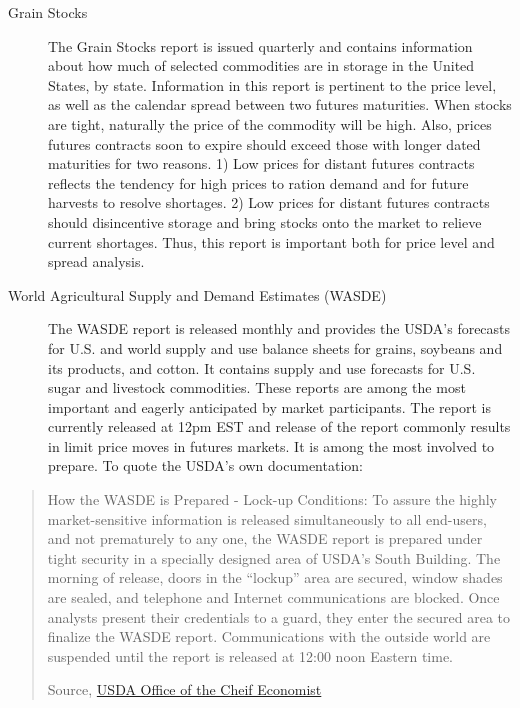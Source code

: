 \documentclass[
]{book}
\begin{document}
\begin{description}
\item[Grain Stocks]
The Grain Stocks report is issued quarterly and contains information about how much of selected commodities are in storage in the United States, by state. Information in this report is pertinent to the price level, as well as the calendar spread between two futures maturities. When stocks are tight, naturally the price of the commodity will be high. Also, prices futures contracts soon to expire should exceed those with longer dated maturities for two reasons. 1) Low prices for distant futures contracts reflects the tendency for high prices to ration demand and for future harvests to resolve shortages. 2) Low prices for distant futures contracts should disincentive storage and bring stocks onto the market to relieve current shortages. Thus, this report is important both for price level and spread analysis.
\item[World Agricultural Supply and Demand Estimates (WASDE)]
The WASDE report is released monthly and provides the USDA's forecasts for U.S. and world supply and use balance sheets for grains, soybeans and its products, and cotton. It contains supply and use forecasts for U.S. sugar and livestock commodities. These reports are among the most important and eagerly anticipated by market participants. The report is currently released at 12pm EST and release of the report commonly results in limit price moves in futures markets. It is among the most involved to prepare. To quote the USDA's own documentation:
\end{description}

\begin{quote}
How the WASDE is Prepared - Lock-up Conditions: To assure the highly market-sensitive information is released simultaneously to all end-users, and not prematurely to any one, the WASDE report is prepared under tight security in a specially designed area of USDA's South Building. The morning of release, doors in the ``lockup'' area are secured, window shades are sealed, and telephone and Internet communications are blocked. Once analysts present their credentials to a guard, they enter the secured area to finalize the WASDE report. Communications with the outside world are suspended until the report is released at 12:00 noon Eastern time.

Source, \href{http://www.usda.gov/oce/commodity/wasde/prepared.htm}{USDA Office of the Cheif Economist}
\end{quote}
\end{document}
